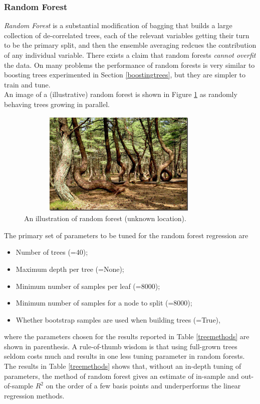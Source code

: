 \documentclass[
11pt, %
a4paper, %
oneside, %
headinclude,footinclude, %
BCOR5mm, %
]{scrartcl}
\begin{document}
\subsubsection{Random Forest}
\textit{Random Forest} is a substantial modification of bagging that builds a large collection of de-correlated trees, each of the relevant variables getting their turn to be the primary split, and then the ensemble averaging redcues the contribution of any individual variable. There exists a claim that random forests \textit{cannot overfit} the data. On many problems the performance of random forests is very similar to boosting trees experimented in Section \ref{boostingtrees}, but they are simpler to train and tune.\\
\newline
An image of a (illustrative) random forest is shown in Figure \ref{rf} as randomly behaving trees growing in parallel.
\begin{figure}[ht!]
\centering
\includegraphics[width=10cm, height=5cm]{rf.jpg} 
\caption{An illustration of random forest (unknown location).}\label{rf}
\end{figure}


The primary set of parameters to be tuned for the random forest regression are
\begin{itemize}[noitemsep]
	\item Number of trees (=40);
	\item Maximum depth per tree (=None);
	\item Minimum number of samples per leaf (=8000);
	\item Minimum number of samples for a node to split (=8000);
	\item Whether bootstrap samples are used when building trees (=True),
\end{itemize}
where the parameters chosen for the results reported in Table \ref{treemethods} are shown in parenthesis. A rule-of-thumb wisdom is that using full-grown trees seldom costs much and results in one less tuning parameter in random forests.\\
\newline
The results in Table \ref{treemethods}
shows that, without an in-depth tuning of parameters, the method of random forest gives an estimate of in-sample and out-of-sample $R^2$ on the order of a few basis points and underperforms the linear regression methods.
\end{document}
